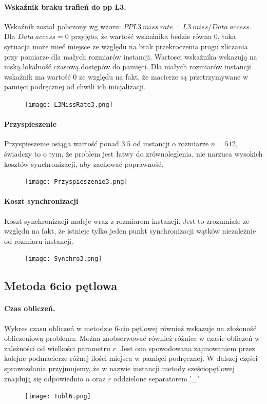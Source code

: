 \documentclass{scrartcl}
\begin{document}
\paragraph{Wskaźnik braku trafień do pp L3.} Wskaźnik został policzony wg wzoru: $PPL3\ miss\ rate = L3\ miss / Data\ access$. Dla $Data\ access = 0$ przyjęto, że wartość wskaźnika bedzie równa 0, taka sytuacja może mieć miejsce ze względu na brak przekroczenia progu zliczania przy pomiarze dla małych rozmiarów instancji. Wartosci wskaźnika wskazują na niską lokalność czasową dostępów do pamięci. Dla małych rozmiarów instancji wskaźnik ma wartość 0 ze względu na fakt, że macierze są przetrzymywane w pamięci podręcznej od chwili ich inicjalizacji.
\begin{figure}[H]
\texttt{[image: L3MissRate3.png]}
\end{figure}
\newpage
\paragraph{Przyspieszenie} Przyspieszenie osiąga wartość ponad $3.5$ od instancji o rozmiarze $n = 512$, świadczy to o tym, że problem jest łatwy do zrównoleglenia, nie narzuca wysokich kosztów synchronizacji, aby zachować poprawność.
\begin{figure}[H]
\texttt{[image: Przyspieszenie3.png]}
\end{figure}
\paragraph{Koszt synchronizacji} Koszt synchronizacji maleje wraz z rozmiarem instancji. Jest to zrozumiałe ze względu na fakt, że istnieje tylko jeden punkt synchronizacji wątków niezależnie od rozmiaru instancji.
\begin{figure}[H]
\texttt{[image: Synchro3.png]}
\end{figure}

\subsection{Metoda 6cio pętlowa}

\paragraph{Czas obliczeń.} Wykres czasu obliczeń w metodzie 6-cio pętlowej również wskazuje na złożoność obliczeniową problemu. Można zaobserwować również różnice w czasie obliczeń w zależności od wielkości parametru $r$. Jest ona spowodowana zajmowaniem przez kolejne podmacierze różnej ilości miejsca w pamięci podręcznej. W dalszej części sprawozdania przyjmujemy, że w nazwie instancji metody sześciopętlowej znajdują się odpowiednio $n$ oraz $r$ oddzielone separatorem '\_'
\begin{figure}[H]
\texttt{[image: Tobl6.png]}
\end{figure}
\end{document}
